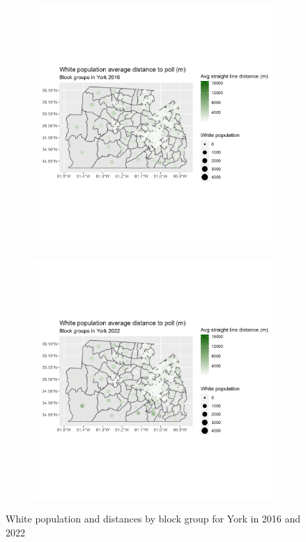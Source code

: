 \documentclass[11pt]{article}
\theoremstyle{remark}
\theoremstyle{definition}
\begin{document}
\begin{figure}
	\begin{subfigure}{.5\textwidth}
		\centering
		\includegraphics[width=\linewidth]{result_analysis/York_SC_original_configs/white_pop_and_dist_York_config_original_2016_polls.png}
		\label{sfig:York_2016_bg_dist_pop}
	\end{subfigure} 
	\begin{subfigure}{.5\textwidth}
		\centering
		\includegraphics[width=\linewidth]{result_analysis/York_SC_original_configs/white_pop_and_dist_York_config_original_2022_polls.png}
		\label{sfig:York_2022_bg_dist}
	\end{subfigure}
	\caption{White population and distances by block group for York in 2016 and 2022}
	\label{fig:York distance White population maps}
\end{figure}
\end{document}
